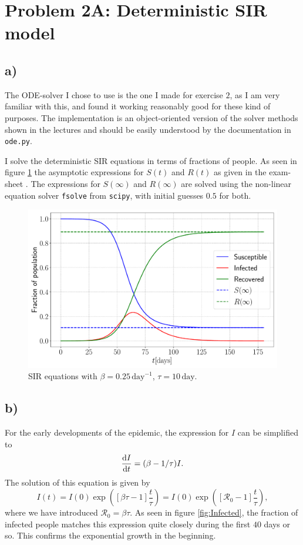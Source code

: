 \section{Problem 2A: Deterministic SIR model}

\subsection{a)}

The ODE-solver I chose to use is the one I made for exercise $2$, as I am very familiar with this, and found it working reasonably good for these kind of purposes. The implementation is an object-oriented version of the solver methods shown in the lectures and should be easily understood by the documentation in \lstinline|ode.py|.

I solve the deterministic SIR equations in terms of fractions of people. As seen in figure \ref{fig:SIR} the asymptotic expressions for $S(t)$ and $R(t)$ as given in the exam-sheet \cite{sheet}. The expressions for $S(\infty)$ and $R(\infty)$ are solved using the non-linear equation solver \lstinline|fsolve| from \lstinline|scipy|, with initial guesses $0.5$ for both.

\begin{figure}[htb]
	\centering
	\includegraphics[width=0.8\columnwidth]{../fig/2Aa_SIR.pdf}
	\caption{SIR equations with $\beta = 0.25 \, \mathrm{day}^{-1}$, $\tau = 10 \, \mathrm{day}$.}
	\label{fig:SIR}
\end{figure}

\subsection{b)}

For the early developments of the epidemic, the expression for $I$ can be simplified to \cite{sheet}
\begin{equation}\label{eq:I_simp}
	\frac{\text{d} I}{\text{d} t} = (\beta - 1/\tau) I.
\end{equation}
The solution of this equation is given by
$$
	I(t) = I(0) \exp{\left(\left[ \beta \tau - 1 \right] \frac{t}{\tau}\right)} = I(0) \exp{\left(\left[ \mathcal{R}_0 - 1 \right] \frac{t}{\tau} \right)},
$$
where we have introduced $\mathcal{R}_0 = \beta\tau$. As seen in figure \ref{fig:Infected}, the fraction of infected people matches this expression quite closely during the first $40$ days or so. This confirms the exponential growth in the beginning. 

